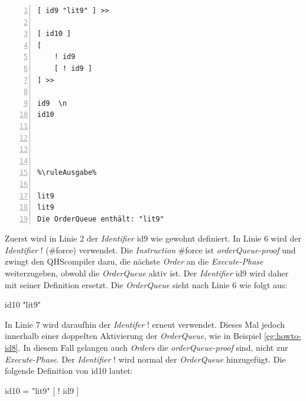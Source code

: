 \begin{minipage}{\linewidth}
\begin{multicols}{2}
\begin{lstlisting}[language=QHS, label=eg:howto-id9, caption=Beispiel zu {\selectListingFont \#force} , numbers=left, stepnumber=1]
%\ruleEingabe%
[ id9 "lit9" ] >>

[ id10 ]
[
    ! id9
    [ ! id9 ]
] >>

id9  \n
id10




%\ruleAusgabe%

lit9
lit9
Die OrderQueue enthält: "lit9"
\end{lstlisting}
\columnbreak
Zuerst wird in Linie 2 der \textit{Identifier} {\selectListingFont id9} wie gewohnt definiert. In Linie 6 wird der \textit{Identifier} {\selectListingFont !} ({\selectListingFont \#force}) verwendet.
Die \textit{Instruction} {\selectListingFont \#force} ist \textit{orderQueue-proof} und zwingt den QHScompiler dazu, die nächste \textit{Order} an die \textit{Execute-Phase} weiterzugeben, obwohl die \textit{OrderQueue} aktiv ist.
Der \textit{Identifier} {\selectListingFont id9} wird daher mit seiner Definition ersetzt. Die \textit{OrderQueue} sieht nach Linie 6 wie folgt aus: \break
\centerline{\selectListingFont id10 "lit9"{}}
In Linie 7 wird daraufhin der \textit{Identifer} {\selectListingFont !} erneut verwendet. Dieses Mal jedoch innerhalb einer doppelten Aktivierung der \textit{OrderQueue}, wie in Beispiel \ref{eg:howto-id8}.
In diesem Fall gelangen auch \textit{Orders} die \textit{orderQueue-proof} sind, nicht zur \textit{Execute-Phase}. Der \textit{Identifier} {\selectListingFont !} wird normal der \textit{OrderQueue} hinzugefügt.
Die folgende Definition von {\selectListingFont id10} lautet: \break
\centerline{\selectListingFont id10 = "lit9"{} [ ! id9 ]}
\end{multicols}
\end{minipage}
\vspace{\baselineskip}

